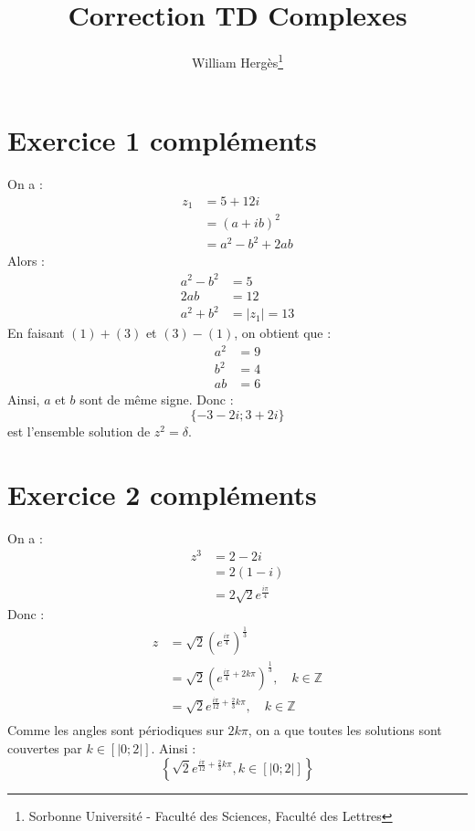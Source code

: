 \documentclass[a4paper, titlepage]{article}
\title{Correction TD Complexes}
\author{William Hergès\thanks{Sorbonne Université - Faculté des Sciences, Faculté des Lettres}}
\begin{document}
	\maketitle
	\section*{Exercice 1 compléments}
	On a :
	\begin{align*}
		z_1 &= 5+12i \\
			&= (a+ib)^2 \\
			&= a^2-b^2+2ab
	\end{align*}
	Alors :
	\begin{align*}
		a^2-b^2 &= 5 \\
		2ab &= 12 \\
		a^2+b^2 &= |z_1| = 13
	\end{align*}
	En faisant $(1)+(3)$ et $(3)-(1)$, on obtient que :
	\begin{align*}
		a^2 &= 9 \\
		b^2 &= 4 \\
		ab &= 6
	\end{align*}
	Ainsi, $a$ et $b$ sont de même signe. Donc :
	$$ \{-3-2i;3+2i\} $$
	est l'ensemble solution de $z^2=\delta$.
	\section*{Exercice 2 compléments}
	On a :
	\begin{align*}
		z^3 &= 2-2i \\ 
			&= 2(1-i)\\
			&= 2\sqrt 2e^{\frac{i\pi}{4}}
	\end{align*}
	Donc :
	\begin{align*}
		z &= \sqrt 2\left( e^{\frac{i\pi}{4}} \right)^{\frac{1}{3}} \\
		  &= \sqrt 2\left( e^{\frac{i\pi}{4}+2k\pi} \right)^{\frac{1}{3}},\quad k\in\mathbb{Z} \\
		  &= \sqrt 2e^{\frac{i\pi}{12}+\frac{2}{3}k\pi},\quad k\in\mathbb{Z} \\
	\end{align*}
	Comme les angles sont périodiques sur $2k\pi$, on a que toutes les solutions sont couvertes par $k\in[|0;2|]$. Ainsi :
	$$ \left\{\sqrt 2e^{\frac{i\pi}{12}+\frac{2}{3}k\pi},k\in[|0;2|]\right\} $$
\end{document}
